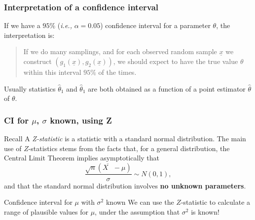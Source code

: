 \documentclass[xcolor=dvipsnames]{beamer}
\begin{document}
\begin{frame}
\frametitle{Interpretation of a confidence interval}
\par If we have a $95\%$ ({\it i.e.,} $\alpha=0.05$) confidence interval for a parameter $\theta$, the interpretation is:\\
\vspace{0.25cm}
\begin{quote}
If we do many samplings, and for each observed random sample ${\underline x}$ we construct $(g_1({\underline x}),g_2({\underline x}))$, we should expect to have the true value $\theta$ within this interval $95\%$ of the times.
\end{quote}
\vspace{0.25cm}
\par\noindent Usually statistics ${\hat \theta}_1$ and ${\hat \theta}_1$ are both obtained as a function of a point estimator ${\hat \theta}$ of $\theta$.
\end{frame}

\begin{frame}
\frametitle{CI for $\mu$, $\sigma$ known, using Z}
\begin{alertblock}{Recall} 
A \textit{Z-statistic} is a statistic with a standard normal distribution.
 The main use of $Z$-statistics stems from the facts that, for a
general distribution, the Central Limit Theorem implies asymptotically that
\[
\frac{\sqrt{n}(\overline{X\text{ }}-\mu)}{\sigma}\sim N\left(  0,1\right)  ,
\]
and that the standard normal distribution involves \textbf{no unknown parameters}.
\end{alertblock}
\begin{alertblock}{Confidence interval for $\mu$ with $\sigma^{2}$ known}
 We can use the $Z$-statistic to calculate a range of plausible values for $\mu$, under the assumption that
$\sigma^{2}$ is known!
\end{alertblock}
\end{frame}
\end{document}
